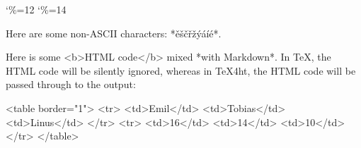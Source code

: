 \documentclass{book}
\begin{document}

\catcode`\%=12\relax
{}
\catcode`\%=14\relax

\begin{markdown}
Here are some non-ASCII characters: *ěščřžýáíé*.
\end{markdown}

\begin{markdown}
Here is some <b>HTML code</b> mixed *with Markdown*. In \TeX, the HTML code
will be silently ignored, whereas in \TeX 4ht, the HTML code will be passed
through to the output:

<table border="1">
  <tr>
    <td>Emil</td>
    <td>Tobias</td>
    <td>Linus</td>
  </tr>
  <tr>
    <td>16</td>
    <td>14</td>
    <td>10</td>
  </tr>
</table>
\end{markdown}
\end{document}
